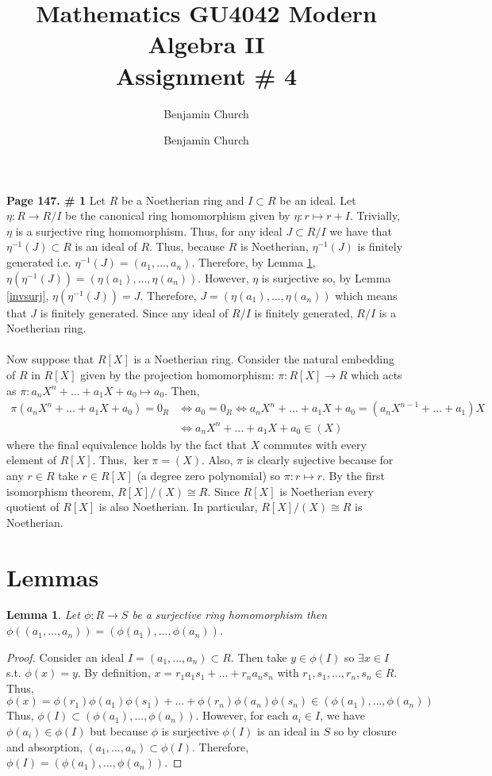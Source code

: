 \documentclass[12pt]{extarticle}
\author{Benjamin Church }
\newcommand{\invI}[2]{#1^{-1} \left( #2 \right)}
\newcommand{\atitle}[1]{\title{%
	\large \textbf{Mathematics GU4042 Modern Algebra II
	\\ Assignment \# #1} \vspace{-2ex}}
\author{Benjamin Church }
\maketitle}
\newtheorem{lemma}[theorem]{Lemma}
\begin{document}
\atitle{4}
\textbf{Page 147. \# 1} Let $R$ be a Noetherian ring and $I \subset R$ be an ideal. Let $\eta : R \rightarrow R/I$ be the canonical ring homomorphism given by $\eta : r \mapsto r + I$. Trivially, $\eta$ is a surjective ring homomorphism. Thus, for any ideal $J \subset R/I$ we have that $\invI{\eta}{J} \subset R$ is an ideal of $R$. Thus, because $R$ is Noetherian, $\invI{\eta}{J}$ is finitely generated i.e. $\invI{\eta}{J} = (a_1, \dots, a_n)$. Therefore, by Lemma \ref{genhomo}, $\eta(\invI{\eta}{J}) = (\eta(a_1), \dots, \eta(a_n))$. However, $\eta$ is surjective so, by Lemma \ref{invsurj}, $\eta(\invI{\eta}{J}) = J$. Therefore, $J = (\eta(a_1), \dots, \eta(a_n))$ which means that $J$ is finitely generated. Since any ideal of $R/I$ is finitely generated, $R/I$ is a Noetherian ring. 
\\ \\

Now suppose that $R[X]$ is a Noetherian ring. Consider the natural embedding of $R$ in $R[X]$ given by the projection homomorphism: $\pi : R[X] \rightarrow R$ which acts as $\pi : a_n X^n + \dots + a_1 X + a_0 \mapsto a_0$. Then,
\begin{align*}
\pi(a_n X^n + \dots + a_1 X + a_0) = 0_R & \iff a_0 = 0_R \iff a_n X^n + \dots + a_1 X + a_0 = (a_n X^{n-1} + \dots + a_1) X \\ & \iff a_n X^n + \dots + a_1 X + a_0 \in (X)
\end{align*}
where the final equivalence holds by the fact that $X$ commutes with every element of $R[X]$. Thus, $\ker{\pi} = (X)$. Also, $\pi$ is clearly sujective because for any $r \in R$ take $r \in R[X]$ (a degree zero polynomial) so $\pi : r \mapsto r$. By the first isomorphism theorem, $R[X]/(X) \cong R$. Since $R[X]$ is Noetherian every quotient of $R[X]$ is also Noetherian. In particular, $R[X]/(X) \cong R$ is Noetherian.    
\section*{Lemmas}

\begin{lemma} \label{genhomo}
Let $\phi : R \rightarrow S$ be a surjective ring homomorphism then $\phi((a_1, \dots , a_n)) = (\phi(a_1), \dots , \phi(a_n))$.
\end{lemma}
\begin{proof}
Consider an ideal $I = (a_1, \dots, a_n) \subset R$. Then take $y \in \phi(I)$ so $\exists x \in I$ s.t. $\phi(x) = y$. By definition, $x = r_1 a_1 s_1 + \dots + r_n a_n s_n$ with $r_1, s_1, \dots, r_n , s_n \in R$. Thus, \[\phi(x) = \phi(r_1) \phi(a_1) \phi(s_1) + \dots + \phi(r_n) \phi(a_n) \phi(s_n) \in (\phi(a_1), \dots, \phi(a_n))\] Thus, $\phi(I) \subset (\phi(a_1), \dots, \phi(a_n))$. However, for each $a_i \in I$, we have $\phi(a_i) \in \phi(I)$ but because $\phi$ is surjective $\phi(I)$ is an ideal in $S$ so by closure and absorption, $(a_1, \dots, a_n) \subset \phi(I)$. Therefore, $\phi(I) = (\phi(a_1), \dots, \phi(a_n))$.
\end{proof}
\end{document}
